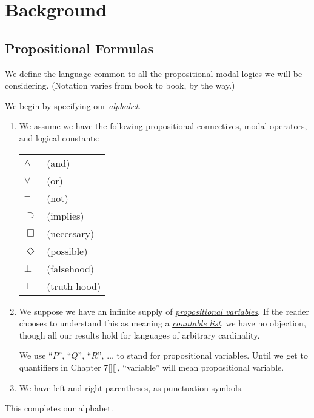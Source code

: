 \chapter{Background}



\section{Propositional Formulas}\label{sec:1-1}


We define the language common to all the propositional modal logics we will be considering.
% 
(Notation varies from book to book, by the way.)



We begin by specifying our \underline{\textit{alphabet}}.
\begin{enumerate}[itemsep=5pt,parsep=5pt,leftmargin=3em,topsep=5pt,label=\arabic*)] %
    \item 
    We assume we have the following propositional connectives, modal operators, and logical constants:
    \begin{center}
        \renewcommand{\arraystretch}{1.3} %
        \renewcommand{\arraycolsep}{1.2em} %
    \begin{tabular}{ll}
        $\land$ & (and) \\
        $\lor$ & (or) \\
        $\lnot$ & (not) \\
        $\supset$ & (implies) \\  
        $\Box$ & (necessary) \\
        $\Diamond$ & (possible) \\
        $\bot$ & (falsehood) \\
        $\top$ & (truth-hood) \\
    \end{tabular}
    \end{center}

    \item 
    We suppose we have an infinite supply of \underline{\textit{propositional variables}}.
    If the reader chooses to understand this as meaning a \underline{\textit{countable list}}, 
    we have no objection, 
    though all our results hold for languages of arbitrary cardinality.



    We use ``$P$'', ``$Q$'', ``$R$'', $\dots$ to stand for propositional variables.
    Until we get to quantifiers in Chapter 7[][],
    ``variable'' will mean propositional variable.


    \item 
    We have left and right parentheses, as punctuation symbols.
\end{enumerate}
% 
This completes our alphabet.


